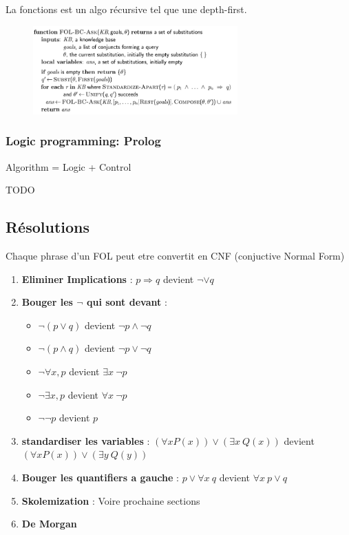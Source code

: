 		La fonctions est un algo récursive tel que une depth-first.
		
		\begin{figure}[htp]	
			\centering
			\includegraphics[width=0.7\textwidth]{img/BackWardChaining.png}
		\end{figure}		
		
		\subsubsection{Logic programming: Prolog}
			Algorithm = Logic + Control
			
			TODO
			
	\subsection{Résolutions}
		Chaque phrase d'un FOL peut etre convertit en CNF (conjuctive Normal Form)
			
		\begin{enumerate}
			\item \textbf{Eliminer Implications} : $p \Rightarrow q$ devient $\neg  \lor q$ 
			\item \textbf{Bouger  les $\neg$ qui sont devant}  :
			\begin{itemize}
				\item $\neg(p\lor q)$ devient $\neg p \land \neg q$
				\item $\neg(p\land q)$ devient $\neg p \lor \neg q$
				\item $\neg \forall x, p$ devient $ \exists x \ \neg p$
				\item $\neg \exists x, p$ devient $\forall x\  \neg p$
				\item $\neg \neg p$ devient $p$
			\end{itemize}
			\item \textbf{standardiser les variables} : $(\forall x P(x)) \lor (\exists x \ Q(x))$ devient $(\forall x P(x)) \lor (\exists y \ Q(y))$
			\item \textbf{Bouger les quantifiers a gauche} : $p \lor \forall x \ q$ devient $\forall x \ p \lor q$
			\item \textbf{Skolemization} : Voire prochaine sections
			\item \textbf{De Morgan}
		\end{enumerate}
		
